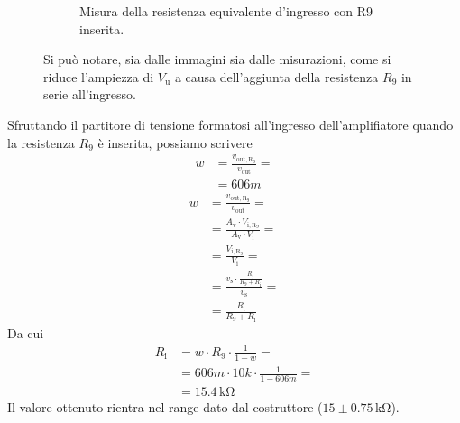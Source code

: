 \documentclass[a4paper]{article}
\begin{document}
\begin{figure}[h!]
\begin{subfigure}{0.4\textwidth}
						\caption{Misura della resistenza equivalente d'ingresso con R9 inserita.}
					\end{subfigure}
					\label{fig:misuraDellaResistenzaEquivalenteInIngressoAmplificatoreInvertente}
					\caption{Si può notare, sia dalle immagini sia dalle misurazioni, come si riduce l'ampiezza di $ V_{\mathrm{u}} $ a causa dell'aggiunta della resistenza $ R_{9} $ in serie all'ingresso.}
				\end{figure}
				\newline
				Sfruttando il partitore di tensione formatosi all'ingresso dell'amplifiatore quando la resistenza $ R_{9} $ è inserita, possiamo scrivere
				\begin{equation*}
					\begin{split}
						w &= \frac{v_{\mathrm{out,R_{9}}}}{v_{\mathrm{out}}} = \\
						  &= 606m
					\end{split}
				\end{equation*}
				\begin{equation*}
					\begin{split}
						w &= \frac{v_{\mathrm{out,R_{9}}}}{v_{\mathrm{out}}} = \\
						  &= \frac{A_{\mathrm{v}} \cdot V_{\mathrm{i,R_{9}}}}{A_{\mathrm{v}} \cdot V_{\mathrm{i}}} = \\
						  &= \frac{V_{\mathrm{i,R_{9}}}}{V_{\mathrm{i}}} = \\
						  &= \frac{v_{\mathrm{s}} \cdot \frac{R_{\mathrm{i}}}{R_{9} + R_{\mathrm{i}}}}{v_{\mathrm{s}}} = \\
						  &= \frac{R_{\mathrm{i}}}{R_{9} + R_{\mathrm{i}}}
					\end{split}
				\end{equation*}
				Da cui
				\begin{equation*}
					\begin{split}
						R_{\mathrm{i}} &= w \cdot R_{9} \cdot \frac{1}{1 - w} = \\
									   &= 606m \cdot 10k \cdot \frac{1}{1 - 606m} = \\
									   &= 15.4 \, \mathrm{k\Omega}
					\end{split}
				\end{equation*}
				Il valore ottenuto rientra nel range dato dal costruttore ($ 15 \pm 0.75 \, \mathrm{k\Omega} $).
\end{document}
